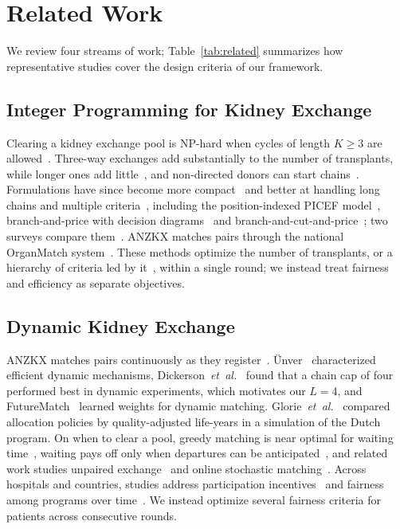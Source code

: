 \documentclass[journal]{IEEEtran}
\begin{document}
\section{Related Work}
\label{sec:related}

We review four streams of work; Table~\ref{tab:related} summarizes how
representative studies cover the design criteria of our framework.

\subsection{Integer Programming for Kidney Exchange}
\label{sec:related:ilp}

Clearing a kidney exchange pool is NP-hard when cycles of length
$K \geq 3$ are allowed~\cite{abraham2007clearing}. Three-way exchanges
add substantially to the number of transplants, while longer ones add
little~\cite{roth2007efficient,saidman2006increasing}, and non-directed
donors can start chains~\cite{montgomery2006domino}. Formulations have
since become more compact~\cite{constantino2013new} and better at
handling long chains and multiple
criteria~\cite{glorie2014kidney,anderson2015new}, including the
position-indexed PICEF model~\cite{dickerson2016picef}, branch-and-price
with decision diagrams~\cite{riascos2024branch} and
branch-and-cut-and-price~\cite{lam2020branch}; two surveys compare
them~\cite{barkel2025operational,biro2021modelling}. ANZKX matches pairs
through the national OrganMatch system~\cite{anzkxprotocol2021}. These
methods optimize the number of transplants, or a hierarchy of criteria
led by it~\cite{biro2021modelling}, within a single round; we instead
treat fairness and efficiency as separate objectives.

\subsection{Dynamic Kidney Exchange}
\label{sec:related:dynamic}

ANZKX matches pairs continuously as they register~\cite{ANZKX2021}.
\"{U}nver~\cite{unver2010dynamic} characterized efficient dynamic
mechanisms, Dickerson~\textit{et~al.}~\cite{dickerson2012optimizing}
found that a chain cap of four performed best in dynamic experiments, which motivates our $L = 4$, and FutureMatch~\cite{dickerson2015futurematch}
learned weights for dynamic matching. Glorie~\textit{et~al.}~\cite{glorie2022health}
compared allocation policies by quality-adjusted life-years in a
simulation of the Dutch program. On when to clear a pool,
greedy matching is near optimal for waiting
time~\cite{anderson2017efficient}, waiting pays off only when departures
can be anticipated~\cite{akbarpour2020thickness}, and related work
studies unpaired exchange~\cite{akbarpour2025unpaired} and online
stochastic matching~\cite{huang2021online}. Across hospitals and
countries, studies address participation
incentives~\cite{ashlagi2014free,hajaj2015strategy} and fairness among
programs over time~\cite{klimentova2021fairness,benedek2025partitioned,druzsin2024enckep}.
We instead optimize several fairness criteria for patients across
consecutive rounds.
\end{document}
